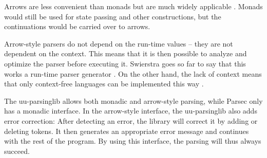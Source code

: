 Arrows are less convenient than monads but are much widely applicable \cite{monad-arrows}.
Monads would still be used for state passing and other constructions, but the continuations would be carried over to arrows.

Arrow-style parsers do not depend on the run-time values -- they are not dependent on the context.
This means that it is then possible to analyze and optimize the parser before executing it.
Swierstra goes so far to say that this works a run-time parser generator \cite{error-correcting}.
On the other hand, the lack of context means that only context-free languages can be implemented this way \cite{parsec}.

The uu-parsinglib allows both monadic and arrow-style parsing, while Parsec only has a monadic interface.
In the arrow-style interface, the uu-parsinglib also adds error correction:
After detecting an error, the library will correct it by adding or deleting tokens.
It then generates an appropriate error message and continues with the rest of the program.
By using this interface, the parsing will thus always succeed.


